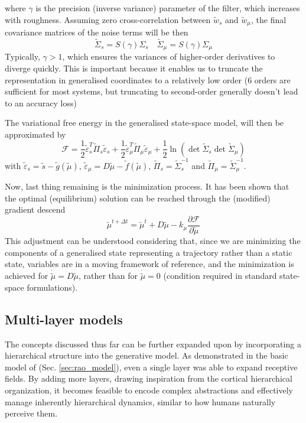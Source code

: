 \documentclass[10pt]{article}
\begin{document}
where $\gamma$ is the precision (inverse variance) parameter of the filter, which increases with roughness. Assuming zero cross-correlation between $\tilde{w}_s$ and $\tilde{w}_{\mu}$, the final covariance matrices of the noise terms will be then 
\begin{equation}
    \tilde{\Sigma}_s = S(\gamma)\Sigma_s \quad  \tilde{\Sigma}_{\mu} = S(\gamma)\Sigma_{\mu} 
\end{equation}
Typically, $\gamma > 1$, which ensures the variances of higher-order derivatives to diverge quickly. This is important because it enables us to truncate the representation in generalised coordinates to a relatively low order (6 orders are sufficient for most systems, but truncating to second-order generally doesn't lead to an accuracy loss)

The variational free energy in the generalised state-space model, will then be approximated by
\begin{equation}
    \mathcal{F} = \frac{1}{2}\tilde{\varepsilon}_s^T \tilde{\Pi}_s \tilde{\varepsilon}_s + \frac{1}{2}\tilde{\varepsilon}_{\mu}^T \tilde{\Pi}_{\mu} \tilde{\varepsilon}_{\mu} + \frac{1}{2} \ln(\det \tilde{\Sigma}_s \det \tilde{\Sigma}_{\mu})
\end{equation}
with $\tilde{\varepsilon}_s = \tilde{s} - \tilde{g}(\tilde{\mu})$, $\tilde{\varepsilon}_{\mu} = D\tilde{\mu} - \tilde{f}(\tilde{\mu})$, $\tilde{\Pi}_s = \tilde{\Sigma}_s^{-1}$ and $\tilde{\Pi}_{\mu} = \tilde{\Sigma}_{\mu}^{-1}$.

Now, last thing remaining is the minimization process. It has been shown \citep{Friston2008} that the optimal (equilibrium) solution can be reached through the (modified) gradient descend
\begin{equation}
    \tilde{\mu}^{t+\Delta t} = \tilde{\mu}^{t} + D\tilde{\mu} - k_{\mu} \frac{\partial \mathcal{F}}{\partial \tilde{\mu}}
\end{equation}
This adjustment can be understood considering that, since we are minimizing the components of a generalised state representing a trajectory rather than a static state, variables are in a moving framework of reference, and the minimization is achieved for $\dot{\tilde{\mu}} = D \tilde{\mu}$, rather than for $\dot{\tilde{\mu}} = 0$ (condition required in standard state-space formulations).  

\subsection{Multi-layer models}
The concepts discussed thus far can be further expanded upon by incorporating a hierarchical structure into the generative model. As demonstrated in the basic model of \citep{Rao1999} (Sec. \ref{sec:rao_model}), even a single layer was able to expand receptive fields. By adding more layers, drawing inspiration from the cortical hierarchical organization, it becomes feasible to encode complex abstractions and effectively manage inherently hierarchical dynamics, similar to how humans naturally perceive them.
\end{document}
